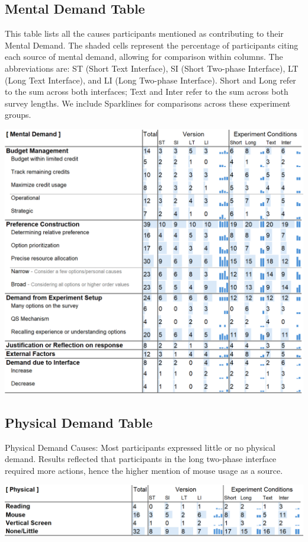 \subsection{Mental Demand Table}
\label{apdx:mental_table}
\begin{table}[h]
   \caption{This table lists all the causes participants mentioned as contributing to their Mental Demand. The shaded cells represent the percentage of participants citing each source of mental demand, allowing for comparison within columns. The abbreviations are: ST (Short Text Interface), SI (Short Two-phase Interface), LT (Long Text Interface), and LI (Long Two-phase Interface). Short and Long refer to the sum across both interfaces; Text and Inter refer to the sum across both survey lengths. We include Sparklines for comparisons across these experiment groups.}
    \label{tbl:mental}
    \includegraphics[width=\linewidth]{content/image/cog/mental_table.png}
\end{table}

\subsection{Physical Demand Table}
\label{apdx:physical_table}
\begin{table}[H]
    \caption{Physical Demand Causes: Most participants expressed little or no physical demand. Results reflected that participants in the long two-phase interface required more actions, hence the higher mention of mouse usage as a source.}
    \label{tbl:physical}
    \includegraphics[width=\linewidth]{content/image/cog/physical_table.png}
\end{table}

